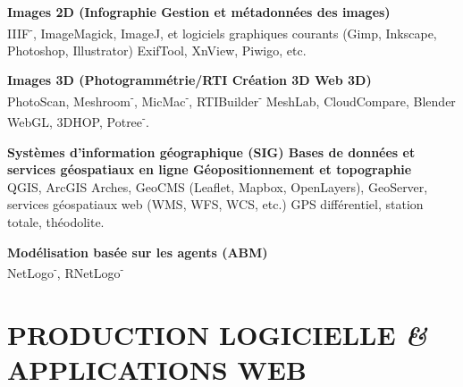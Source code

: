 \documentclass{article}
\newcommand{\fr}[1]{#1}       %
\newcommand{\en}[1]{}     %
\begin{document}
\en{\textsf{Quarto}, \textsf{Rmarkdown}, \textsf{RShiny}, \textsf{Plotly}, \textsf{Jupyter Notebook} \textbf{{\textbar}} \LaTeX, \textsf{Markdown}, Microsoft Office \textbf{{\textbar}} RPubs, HAL, Zenodo.}
\smallbreak
\textbf{\fr{Images 2D (Infographie {\textbar} Gestion et métadonnées des images)}\en{2D Images (Graphics {\textbar} Image Management and Metadata)}} \\
\fr{IIIF\textsuperscript{-}, ImageMagick, ImageJ, et logiciels graphiques courants (Gimp, Inkscape, Photoshop, Illustrator) {\textbar} ExifTool, XnView, Piwigo, etc.}
\en{IIIF\textsuperscript{-}, ImageMagick, ImageJ, and common graphic software (Gimp, Inkscape, Photoshop, Illustrator) {\textbar} ExifTool, XnView, Piwigo, etc.}
\smallbreak
\textbf{\fr{Images 3D (Photogrammétrie/RTI {\textbar} Création 3D {\textbar} Web 3D)}\en{3D Images (Photogrammetry/RTI {\textbar} 3D Creation {\textbar} Web 3D)}} \\
\fr{PhotoScan, Meshroom\textsuperscript{-}, MicMac\textsuperscript{-}, RTIBuilder\textsuperscript{-} {\textbar} MeshLab, CloudCompare, Blender \textbf{{\textbar}} WebGL, 3DHOP, Potree\textsuperscript{-}.}
\en{PhotoScan, Meshroom\textsuperscript{-}, MicMac\textsuperscript{-}, RTIBuilder\textsuperscript{-} {\textbar} MeshLab, CloudCompare, Blender \textbf{{\textbar}} WebGL, 3DHOP, Potree\textsuperscript{-}.}
\smallbreak
\textbf{\fr{Systèmes d'information géographique (SIG) {\textbar} Bases de données et services géospatiaux en ligne {\textbar} Géopositionnement et topographie}\en{Geographic Information Systems (GIS) {\textbar} Online Geospatial Databases and Services {\textbar} Geopositioning and Surveying}} \\
\fr{QGIS, ArcGIS {\textbar} Arches, GeoCMS (\textsf{Leaflet}, \textsf{Mapbox}, \textsf{OpenLayers}), GeoServer, services géospatiaux web (WMS, WFS, WCS, etc.) {\textbar} GPS différentiel, station totale, théodolite.}
\en{QGIS, ArcGIS {\textbar} Arches, GeoCMS (\textsf{Leaflet}, \textsf{Mapbox}, \textsf{OpenLayers}), GeoServer, web geospatial services (WMS, WFS, WCS, etc.) {\textbar} Differential GPS, total station, theodolite.}
\smallbreak
\textbf{\fr{Modélisation basée sur les agents (ABM)}\en{Agent-Based Modeling (ABM)}} \\
\fr{NetLogo\textsuperscript{-}, \textsf{RNetLogo\textsuperscript{-}}}
\en{NetLogo\textsuperscript{-}, \textsf{RNetLogo\textsuperscript{-}}}
\smallbreak


\section{\fr{PRODUCTION LOGICIELLE \textit{\&} APPLICATIONS WEB}\en{SOFTWARE PRODUCTION \textit{\&} WEB APPLICATIONS}}
\end{document}

